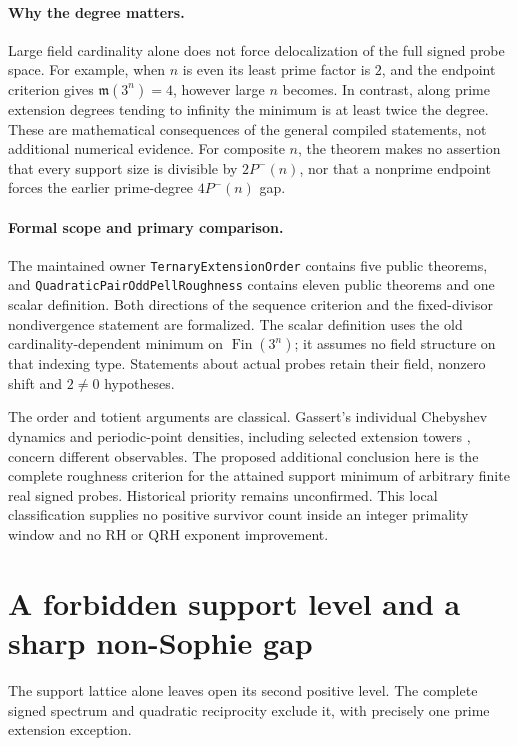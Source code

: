 \documentclass[11pt]{article}
\begin{document}
\paragraph{Why the degree matters.}
Large field cardinality alone does not force delocalization
of the full signed probe space.
For example, when \(n\) is even its least prime factor
is \(2\), and the endpoint criterion gives
\(\mathfrak m(3^n)=4\), however large \(n\) becomes.
In contrast, along prime extension degrees tending to
infinity the minimum is at least twice the degree.
These are mathematical consequences of the general
compiled statements, not additional numerical evidence.
For composite \(n\), the theorem makes no assertion that
every support size is divisible by \(2P^-(n)\), nor that
a nonprime endpoint forces the earlier prime-degree
\(4P^-(n)\) gap.

\paragraph{Formal scope and primary comparison.}
The maintained owner \texttt{TernaryExtensionOrder}
contains five public theorems, and
\texttt{QuadraticPairOddPellRoughness} contains eleven
public theorems and one scalar definition.
Both directions of the sequence criterion and the
fixed-divisor nondivergence statement are formalized.
The scalar definition uses the old cardinality-dependent
minimum on \(\operatorname{Fin}(3^n)\); it assumes no
field structure on that indexing type.
Statements about actual probes retain their field,
nonzero shift and \(2\ne0\) hypotheses.

The order and totient arguments are classical.
Gassert's individual Chebyshev dynamics and periodic-point
densities, including selected extension towers
\cite[Section~4]{GassertChebyshevGraphs}, concern different
observables. The proposed additional conclusion here is
the complete roughness criterion for the attained support
minimum of arbitrary finite real signed probes.
Historical priority remains unconfirmed.
This local classification supplies no positive survivor
count inside an integer primality window and no
RH or QRH exponent improvement.

\section{A forbidden support level and a sharp non-Sophie gap}
\label{sec:odd-pell-forbidden-support-level}

The support lattice alone leaves open its second positive level.
The complete signed spectrum and quadratic reciprocity exclude it,
with precisely one prime extension exception.
\end{document}

